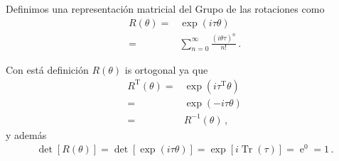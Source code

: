 \begin{frame}

  

Definimos una representación matricial del Grupo de las rotaciones como
\begin{align}
  \label{eq:tye}
  R(\theta)=&\exp \left(i \tau \theta  \right) \nonumber\\
=&\sum_{n=0}^{\infty}\frac{\left(i \theta\tau \right)^{n}}{n!}\,.
\end{align}

Con está definición $R(\theta)$ is ortogonal ya que
\begin{align}
  R^{\operatorname{T}}(\theta)=& \exp \left(i \tau^{\operatorname{T}} \theta  \right) \nonumber\\
        =& \exp \left(-i \tau \theta  \right) \nonumber\\
        =&R^{-1}(\theta)\,,
\end{align}
y además
\begin{align}
  \operatorname{det}[R(\theta)]=\operatorname{det} \left[ \exp \left(i \tau \theta  \right)  \right]
  =\exp \left[ i \operatorname{Tr}(\tau) \right]=\operatorname{e}^0=1\,.
\end{align}




\end{frame}
